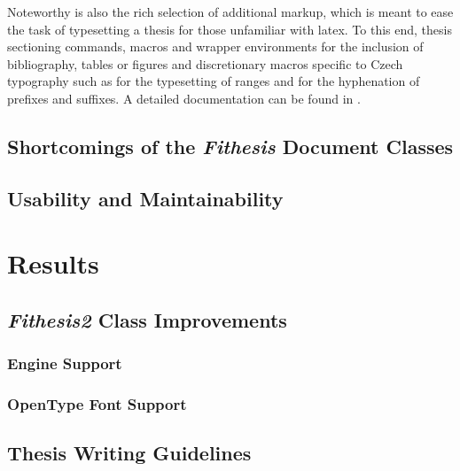         Noteworthy is also the rich selection of additional markup, which is meant to ease the task of typesetting a thesis for those unfamiliar with \gls{latex}. To this end, thesis sectioning commands, macros and wrapper environments for the inclusion of bibliography, tables or figures and discretionary macros specific to Czech typography such as  for the typesetting of ranges and  for the hyphenation of prefixes and suffixes. A detailed documentation can be found in \cite{dippman}. 


    \section{Shortcomings of the \emph{Fithesis} Document Classes}
    \blindtext

    \section{Usability and Maintainability}
    \blindtext

  \chapter{Results}
    \blindtext

    \section{\emph{Fithesis2} Class Improvements}  
    \blindtext

      \subsection{ Engine Support} 
      \blindtext

      \subsection{OpenType Font Support} 
      \blindtext

    \section{Thesis Writing Guidelines} 
    \blindtext

